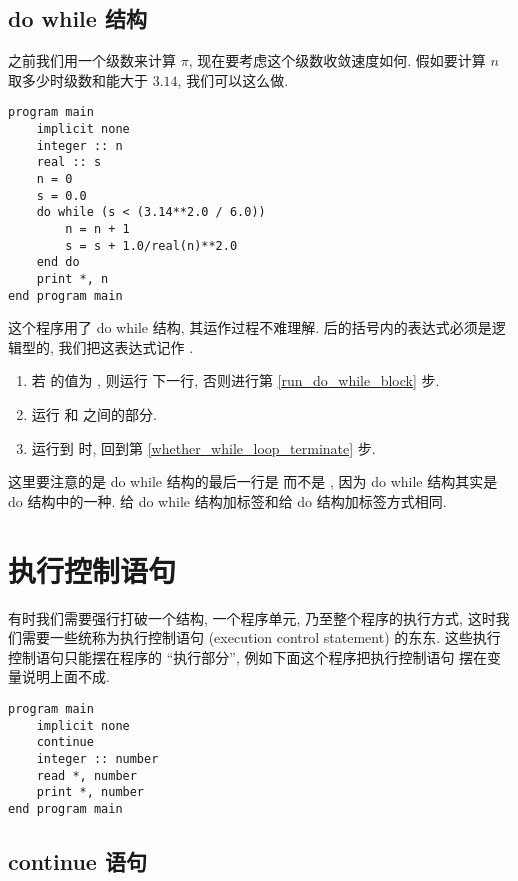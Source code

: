 \subsection{do while 结构}

之前我们用一个级数来计算 $\pi$, 现在要考虑这个级数收敛速度如何. 假如要计算 $n$ 取多少时级数和能大于 $3.14$, 我们可以这么做.
\begin{lstlisting}
program main
    implicit none
    integer :: n
    real :: s
    n = 0
    s = 0.0
    do while (s < (3.14**2.0 / 6.0))
        n = n + 1
        s = s + 1.0/real(n)**2.0
    end do
    print *, n
end program main
\end{lstlisting}
这个程序用了 do while 结构, 其运作过程不难理解.  后的括号内的表达式必须是逻辑型的, 我们把这表达式记作 .
\begin{enumerate}
    \item 若  的值为 , 则运行  下一行, 否则进行第 \ref{run_do_while_block} 步.\label{whether_while_loop_terminate}
    \item 运行  和  之间的部分.\label{run_do_while_block}
    \item 运行到  时, 回到第 \ref{whether_while_loop_terminate} 步.
\end{enumerate}

这里要注意的是 do while 结构的最后一行是  而不是 , 因为 do while 结构其实是 do 结构中的一种. 给 do while 结构加标签和给 do 结构加标签方式相同.

\section{执行控制语句}

有时我们需要强行打破一个结构, 一个程序单元, 乃至整个程序的执行方式, 这时我们需要一些统称为执行控制语句 (execution control statement) 的东东. 这些执行控制语句只能摆在程序的 ``执行部分'', 例如下面这个程序把执行控制语句  摆在变量说明上面不成.
\begin{lstlisting}
program main
    implicit none
    continue
    integer :: number
    read *, number
    print *, number
end program main
\end{lstlisting}

\subsection{continue 语句}

